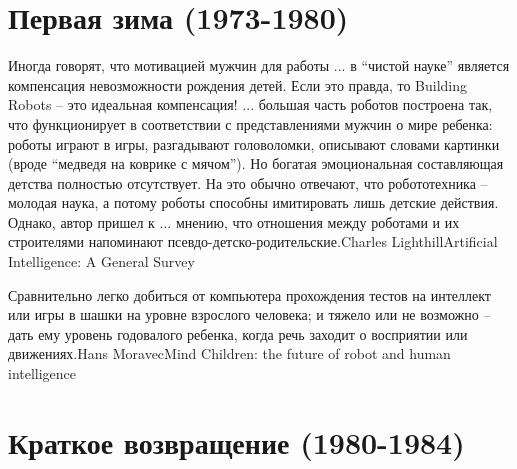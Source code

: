 \documentclass[24pt,pdf,hyperref={unicode},aspectratio=169]{beamer}
\begin{document}
\section{Первая зима (1973-1980)}


\begin{frame}
\end{frame}

\begin{frame}
\citate
{\small
Иногда говорят, что мотивацией мужчин для работы ... в ``чистой науке'' является компенсация невозможности рождения детей. Если это правда, то Building Robots -- это идеальная компенсация! ... большая часть роботов построена так, что функционирует в соответствии с представлениями мужчин о мире ребенка: роботы играют в игры, разгадывают головоломки, описывают словами картинки (вроде ``медведя на коврике с мячом''). Но богатая эмоциональная составляющая детства полностью отсутствует. На это обычно отвечают, что робототехника -- молодая наука, а потому роботы способны имитировать лишь детские действия. Однако, автор пришел к ... мнению, что отношения между роботами и их строителями напоминают псевдо-детско-родительские.}{Charles Lighthill}{Artificial Intelligence: A General Survey}
\end{frame}

\begin{frame}
\end{frame}

\begin{frame}
\citate
{\small
Сравнительно легко добиться от компьютера прохождения тестов на интеллект или игры в шашки на уровне взрослого человека; и тяжело или не возможно -- дать ему уровень годовалого ребенка, когда речь заходит о восприятии или движениях.}{Hans Moravec}{Mind Children: the future of robot and human intelligence}
\end{frame}


\begin{frame}
\end{frame}

\section{Краткое возвращение (1980-1984) }

\begin{frame}
\end{frame}
\end{document}

